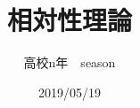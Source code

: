 \documentclass{jsarticle}
\begin{document}
\title{相対性理論}
\author{高校n年　season}
\date{2019/05/19}
\maketitle
\tableofcontents
\newcommand{\repart}[1]{\part{#1}\setcounter{section}{0}}
\newcommand{\lr}[1]{\left(#1 \right)}
\newcommand{\mlr}[1]{\left\{#1 \right\}}
\newcommand{\llr}[1]{\left[#1 \right]}
\newcommand{\rec}[1]{\frac{1}{#1}}
\newcommand{\di}[2][]{\frac{d #1}{d #2}}
\newcommand{\dd}[2][]{\frac{d^2 #1}{d #2^2}}
\newcommand{\pd}[2][]{\frac{\partial #1}{\partial #2}}
\newcommand{\ppd}[3]{\frac{\partial^2 #1}{\partial #2\partial #3}}
\newcommand{\pmat}[1]{\begin{pmatrix} #1 \end{pmatrix}}
\newcommand{\co}[1][]{\cos^{#1}\theta}
\newcommand{\si}[1][]{\sin^{#1}\theta}
\newcommand{\na}{\nabla}
\newcommand{\ga}{\gamma}
\newcommand{\Ga}{\Gamma}
\newcommand{\grad}{\mathrm{grad}}
\newcommand{\dive}{\mathrm{div}}
\newcommand{\rot}{\mathrm{rot}}
\newcommand{\pa}{\partial}
\newcommand{\chr}[2]{\left\{#1 \atop #2\right\}}

\end{document}
